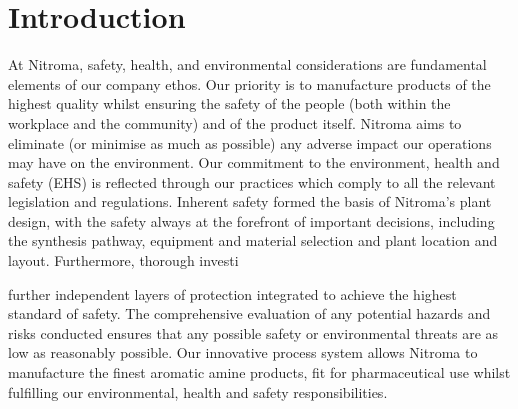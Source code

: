 \section{Introduction}

At Nitroma, safety, health, and environmental considerations are fundamental elements of our company ethos. Our priority is to manufacture products of the highest quality whilst ensuring the safety of the people (both within the workplace and the community) and of the product itself. Nitroma aims to eliminate (or minimise as much as possible) any adverse impact our operations may have on the environment. Our commitment to the environment, health and safety (EHS) is reflected through our practices which comply to all the relevant legislation and regulations. Inherent safety formed the basis of Nitroma’s plant design, with the safety always at the forefront of important decisions, including the synthesis pathway, equipment and material selection and plant location and layout. Furthermore, thorough investi

further independent layers of protection integrated  to achieve the highest standard of safety. The comprehensive evaluation of any potential hazards and risks conducted ensures that any possible safety or environmental threats are as low as reasonably possible. Our innovative process system allows Nitroma to manufacture the finest aromatic amine products, fit for pharmaceutical use whilst fulfilling our environmental, health and safety responsibilities.

